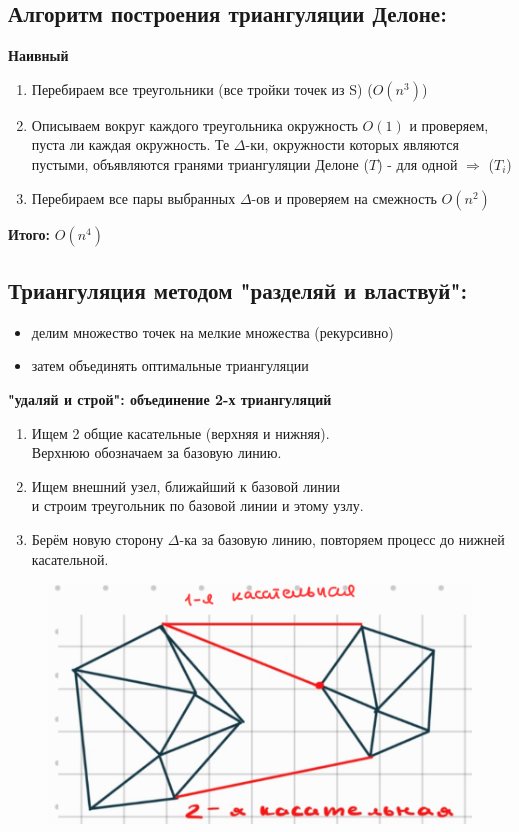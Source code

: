 \subsection*{Алгоритм построения триангуляции Делоне:} 

\textbf{Наивный} 
\begin{enumerate}
	\item Перебираем все треугольники (все тройки точек из S) ($O(n^3)$) 
	\item Описываем вокруг каждого треугольника окружность $O(1)$ и проверяем, пуста ли каждая окружность. Те $\Delta$-ки, окружности которых являются пустыми, объявляются гранями триангуляции Делоне ($T$) - для одной $\Rightarrow$ ($T_i$) 
	\item Перебираем все пары выбранных $\Delta$-ов и проверяем на смежность $O(n^2)$ 
\end{enumerate}

\textbf{Итого:} $O(n^4)$ 

\subsection*{Триангуляция методом "разделяй и властвуй":} 
\begin{itemize}
	\item делим множество точек на мелкие множества (рекурсивно) 
	\item затем объединять оптимальные триангуляции 
\end{itemize}

\textbf{"удаляй и строй": объединение 2-х триангуляций} 
\begin{enumerate}
	\item Ищем 2 общие касательные (верхняя и нижняя). \\
	Верхнюю обозначаем за базовую линию. 
	\item Ищем внешний узел, ближайший к базовой линии \\
	и строим треугольник по базовой линии и этому узлу. 
	\item Берём новую сторону $\Delta$-ка за базовую линию, повторяем процесс до нижней касательной. 
\end{enumerate}

\begin{figure}[h!]
	\centering
	\includegraphics[width=0.4\linewidth]{img/14_3.png}
	\captionsetup{labelformat=empty}
	\caption{}
\end{figure}

